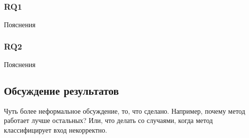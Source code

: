 \subsubsection{RQ1} Пояснения
\subsubsection{RQ2} Пояснения

\clearpage


\subsection{Обсуждение результатов}

Чуть более неформальное обсуждение, то, что сделано. Например, почему метод работает лучше остальных? Или, что делать со случаями, когда метод классифицирует вход некорректно. 

